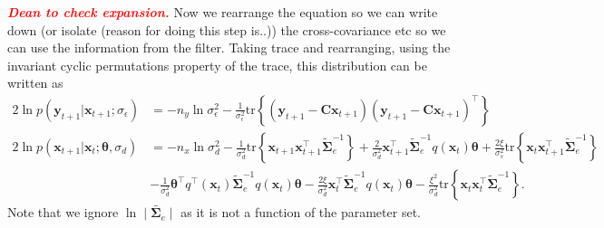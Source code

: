 \documentclass[]{article}
\newcommand{\dean}[1]{\textsf{\emph{\textbf{\textcolor{red}{#1}}}}}
\begin{document}
\dean{Dean to check expansion.} Now we rearrange the equation so we can write down (or isolate (reason for doing this step is..)) the cross-covariance etc so we can use the information from the filter. Taking trace and rearranging, using the invariant cyclic permutations property of the trace, this distribution can be written as
\begin{align}\label{eq:Qfunctiontrace1}
  2\ln p\left(\mathbf y_{t+1}|\mathbf x_{t+1};\sigma_{\epsilon}\right) &= -n_y\ln \sigma_{\epsilon}^2-\frac{1}{\sigma_{\epsilon}^2}\mathrm{tr}\left\lbrace(\mathbf y_{t+1}-\mathbf C\mathbf  x_{t+1}) (\mathbf y_{t+1}-\mathbf C\mathbf  x_{t+1})^\top\right\rbrace    \\
 2 \ln p(\mathbf x_{t+1}|\mathbf x_{t};\boldsymbol \theta ,\sigma_d) &=-n_x\ln\sigma_d^2-\frac{1}{\sigma_d^2}\mathrm{tr}\left\lbrace\mathbf x_{t+1} \mathbf x_{t+1}^\top\tilde{\boldsymbol\Sigma}_e^{-1}\right\rbrace+\frac{2}{\sigma_d^2}\mathbf x_{t+1}^\top\tilde{\boldsymbol\Sigma}_e^{-1}q( \mathbf x_t)\boldsymbol\theta+\frac{2\xi}{\sigma_s^2} \mathrm{tr} \left\lbrace \mathbf x_t\mathbf x_{t+1}^\top\tilde{\boldsymbol\Sigma}_e^{-1}\right\rbrace \nonumber \\
&-\frac{1}{\sigma_d^2}\boldsymbol\theta^\top q^\top(\mathbf x_t)\tilde{\boldsymbol\Sigma}_e^{-1}q(\mathbf x_t)\boldsymbol\theta-\frac{2\xi}{\sigma_d^2} \mathbf x_t^\top\tilde{\boldsymbol\Sigma}_e^{-1}q(\mathbf x_t)\boldsymbol\theta-\frac{\xi^2}{\sigma_d^2}\mathrm{tr}\left\lbrace \mathbf x_t \mathbf x_t^\top\tilde{\boldsymbol\Sigma}_e^{-1}\right\rbrace. \label{eq:Qfunctiontrace2}
\end{align}
Note that we ignore $\ln\mid\tilde{\boldsymbol\Sigma_e}\mid $ as it is not a function of the parameter set.  
\end{document}
